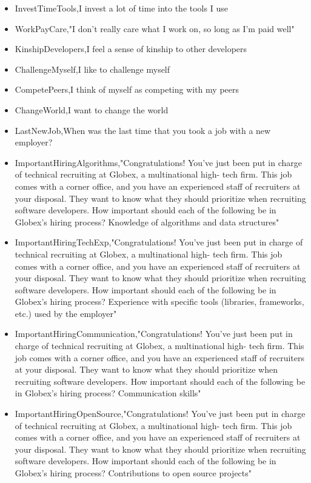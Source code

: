 \begin{appendices}
\begin{itemize}
        \item InvestTimeTools,I invest a lot of time into the tools I use
        \item WorkPayCare,"I don't really care what I work on, so long as I'm paid well"
        \item KinshipDevelopers,I feel a sense of kinship to other developers
        \item ChallengeMyself,I like to challenge myself
        \item CompetePeers,I think of myself as competing with my peers
        \item ChangeWorld,I want to change the world
        \item LastNewJob,When was the last time that you took a job with a new employer?
        \item ImportantHiringAlgorithms,"Congratulations! You've just been put in charge of technical recruiting at Globex, a multinational high- tech firm. This job comes with a corner office, and you have an experienced staff of recruiters at your disposal. They want to know what they should prioritize when recruiting software developers. How important should each of the following be in Globex's hiring process? Knowledge of algorithms and data structures"
        \item ImportantHiringTechExp,"Congratulations! You've just been put in charge of technical recruiting at Globex, a multinational high- tech firm. This job comes with a corner office, and you have an experienced staff of recruiters at your disposal. They want to know what they should prioritize when recruiting software developers. How important should each of the following be in Globex's hiring process? Experience with specific tools (libraries, frameworks, etc.) used by the employer"
        \item ImportantHiringCommunication,"Congratulations! You've just been put in charge of technical recruiting at Globex, a multinational high- tech firm. This job comes with a corner office, and you have an experienced staff of recruiters at your disposal. They want to know what they should prioritize when recruiting software developers. How important should each of the following be in Globex's hiring process? Communication skills"
        \item ImportantHiringOpenSource,"Congratulations! You've just been put in charge of technical recruiting at Globex, a multinational high- tech firm. This job comes with a corner office, and you have an experienced staff of recruiters at your disposal. They want to know what they should prioritize when recruiting software developers. How important should each of the following be in Globex's hiring process? Contributions to open source projects"

\end{itemize}
\end{appendices}
